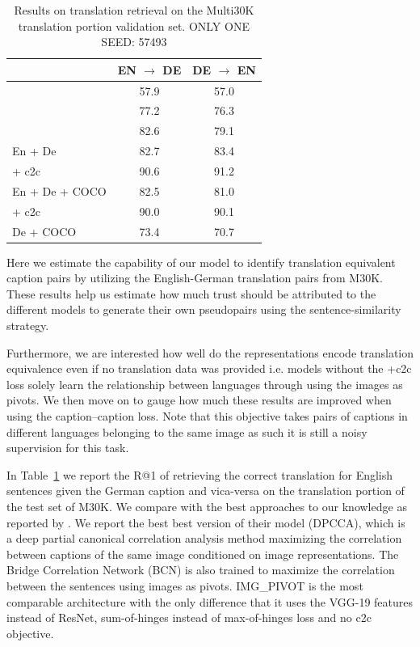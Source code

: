 \begin{table}[]
    \centering
    \begin{tabular}{lcc}
    \toprule
    & EN $\rightarrow$ DE & DE $\rightarrow$ EN \\
    \midrule
    \citet{rajendran2015bridge} & 57.9 & 57.0 \\
    \citet{gella2017image} &  77.2 & 76.3 \\
    \citet{rotman2018bridging} &  82.6 & 79.1 \\
    \midrule
    En + De & 82.7   & 83.4  \\
    \; + c2c & 90.6   & 91.2  \\
    En + De + COCO & 82.5    & 81.0    \\
    \; + c2c & 90.0   & 90.1  \\
    De + COCO & 73.4 &  70.7  \\
        \bottomrule
    \end{tabular}
    \caption{Results on translation retrieval on the Multi30K translation portion validation set. ONLY ONE SEED: 57493}
    \label{tab:translate}
\end{table}

Here we estimate the capability of our model to identify
translation equivalent caption pairs by utilizing the English-German
translation pairs from M30K. 
These results help us estimate how much 
trust should be attributed to the different models
to generate their own pseudopairs using 
the sentence-similarity strategy.

Furthermore, we are interested how well
do the representations encode translation equivalence even if 
no translation data was provided i.e. models without 
the +c2c loss solely learn the 
relationship between languages through using the images 
as pivots. We then move on to gauge how much these 
results are improved when using
the caption--caption loss. Note that this objective takes pairs
of captions in different languages belonging to the same image
as such it is still a noisy supervision for this task.


In Table~\ref{tab:translate}
we report the R@1 of retrieving the correct translation for 
English sentences given the German caption and vica-versa on 
the translation portion of the test set of M30K.
We compare with the best approaches to our knowledge as
reported by \cite{rotman2018bridging}. 
We report the best best version of their
model (DPCCA), which is a deep partial canonical correlation 
analysis method  maximizing the correlation between
captions of the same image conditioned 
on image representations. The Bridge Correlation Network (BCN) 
\cite{rajendran2015bridge} is also trained to maximize the 
correlation between the sentences using images as pivots.
IMG\_PIVOT \cite{gella2017image} is the most comparable architecture
with the only difference that it uses the VGG-19 
features instead of ResNet, sum-of-hinges instead 
of max-of-hinges loss and no c2c objective. 

